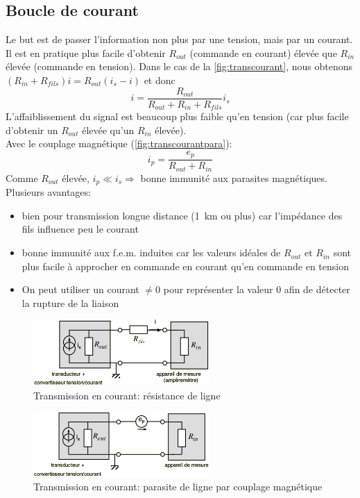 \subsection{Boucle de courant}
Le but est de passer l'information non plus par une tension, mais par un courant. Il est en pratique plus facile d'obtenir \(R_{out}\) (commande en courant) élevée que \(R_{in}\) élevée (commande en tension). Dans le cas de la \autoref{fig:transcourant}, nous obtenons \((R_{in}+R_{fils})i = R_{out}(i_s-i)\) et donc
\[i=\frac{R_{out}}{R_{out}+R_{in}+R_{fils}}i_s\]
L'affaiblissement du signal est beaucoup plus faible qu'en tension (car plus facile d'obtenir un \(R_{out}\) élevée qu'un \(R_{in}\) élevée).\\
Avec le couplage magnétique (\autoref{fig:transcourantpara}):
\[i_p=\frac{e_p}{R_{out}+R_{in}}\]
Comme \(R_{out}\) élevée, \(i_p\ll i_s \Rightarrow\) bonne immunité aux parasites magnétiques.\\
Plusieurs avantages:
\begin{itemize}
	\item bien pour transmission longue distance (\SI{1}{\kilo\meter} ou plus) car l'impédance des fils influence peu le courant
	\item bonne immunité aux f.e.m. induites car les valeurs idéales de \(R_{out}\text{ et }R_{in}\) sont plus facile à approcher en commande en courant qu'en commande en tension
	\item On peut utiliser un courant \(\neq0\) pour représenter la valeur 0 afin de détecter la rupture de la liaison
\end{itemize}
\begin{figure}[H] 
	\centering 
	\includegraphics[width=0.6\textwidth,height=10\baselineskip,keepaspectratio]{ch3/image35} 
	\caption{Transmission en courant: résistance de ligne} 
	\label{fig:transcourant}
\end{figure}
\begin{figure}[H] 
	\centering 
	\includegraphics[width=0.6\textwidth,height=10\baselineskip,keepaspectratio]{ch3/image36} 
	\caption{Transmission en courant: parasite de ligne par couplage magnétique} 
	\label{fig:transcourantpara}
\end{figure}
